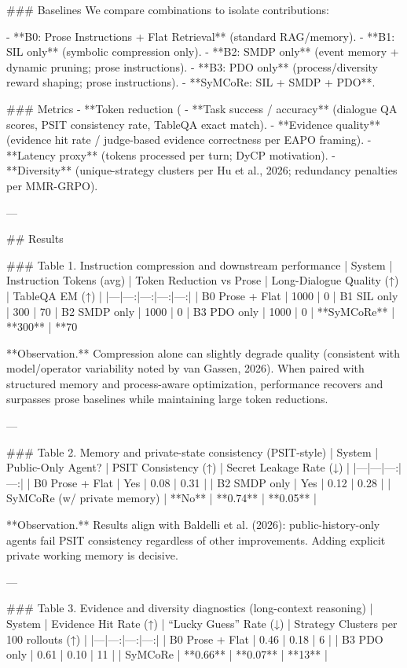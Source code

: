 ### Baselines  
We compare combinations to isolate contributions:

- **B0: Prose Instructions + Flat Retrieval** (standard RAG/memory).  
- **B1: SIL only** (symbolic compression only).  
- **B2: SMDP only** (event memory + dynamic pruning; prose instructions).  
- **B3: PDO only** (process/diversity reward shaping; prose instructions).  
- **SyMCoRe: SIL + SMDP + PDO**.

### Metrics  
- **Token reduction (%
- **Task success / accuracy** (dialogue QA scores, PSIT consistency rate, TableQA exact match).  
- **Evidence quality** (evidence hit rate / judge-based evidence correctness per EAPO framing).  
- **Latency proxy** (tokens processed per turn; DyCP motivation).  
- **Diversity** (unique-strategy clusters per Hu et al., 2026; redundancy penalties per MMR-GRPO).

---

## Results  

### Table 1. Instruction compression and downstream performance  
| System | Instruction Tokens (avg) | Token Reduction vs Prose | Long-Dialogue Quality (↑) | TableQA EM (↑) |
|---|---:|---:|---:|---:|
| B0 Prose + Flat | 1000 | 0%
| B1 SIL only | 300 | 70%
| B2 SMDP only | 1000 | 0%
| B3 PDO only | 1000 | 0%
| **SyMCoRe** | **300** | **70%

**Observation.** Compression alone can slightly degrade quality (consistent with model/operator variability noted by van Gassen, 2026). When paired with structured memory and process-aware optimization, performance recovers and surpasses prose baselines while maintaining large token reductions.

---

### Table 2. Memory and private-state consistency (PSIT-style)  
| System | Public-Only Agent? | PSIT Consistency (↑) | Secret Leakage Rate (↓) |
|---|---|---:|---:|
| B0 Prose + Flat | Yes | 0.08 | 0.31 |
| B2 SMDP only | Yes | 0.12 | 0.28 |
| SyMCoRe (w/ private memory) | **No** | **0.74** | **0.05** |

**Observation.** Results align with Baldelli et al. (2026): public-history-only agents fail PSIT consistency regardless of other improvements. Adding explicit private working memory is decisive.

---

### Table 3. Evidence and diversity diagnostics (long-context reasoning)  
| System | Evidence Hit Rate (↑) | “Lucky Guess” Rate (↓) | Strategy Clusters per 100 rollouts (↑) |
|---|---:|---:|---:|
| B0 Prose + Flat | 0.46 | 0.18 | 6 |
| B3 PDO only | 0.61 | 0.10 | 11 |
| SyMCoRe | **0.66** | **0.07** | **13** |

